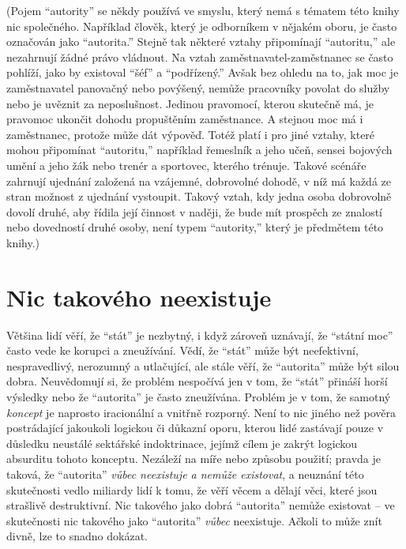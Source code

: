 \documentclass{book}
\begin{document}
(Pojem \enquote{autority} se někdy používá ve smyslu, který nemá s tématem této knihy nic společného. Například člověk, který je odborníkem v nějakém oboru, je často označován jako \enquote{autorita.} Stejně tak některé vztahy připomínají \enquote{autoritu,} ale nezahrnují žádné právo vládnout. Na vztah zaměstnavatel-zaměstnanec se často pohlíží, jako by existoval \enquote{šéf} a \enquote{podřízený.} Avšak bez ohledu na to, jak moc je zaměstnavatel panovačný nebo povýšený, nemůže pracovníky povolat do služby nebo je uvěznit za neposlušnost. Jedinou pravomocí, kterou skutečně má, je pravomoc ukončit dohodu propuštěním zaměstnance. A stejnou moc má i zaměstnanec, protože může dát výpověď. Totéž platí i pro jiné vztahy, které mohou připomínat \enquote{autoritu,} například řemeslník a jeho učeň, sensei bojových umění a jeho žák nebo trenér a sportovec, kterého trénuje. Takové scénáře zahrnují ujednání založená na vzájemné, dobrovolné dohodě, v níž má každá ze stran možnost z ujednání vystoupit. Takový vztah, kdy jedna osoba dobrovolně dovolí druhé, aby řídila její činnost v naději, že bude mít prospěch ze znalostí nebo dovedností druhé osoby, není typem \enquote{autority,} který je předmětem této knihy.)

\section{Nic takového neexistuje}

Většina lidí věří, že \enquote{stát} je nezbytný, i když zároveň uznávají, že \enquote{státní moc} často vede ke korupci a zneužívání. Vědí, že \enquote{stát} může být neefektivní, nespravedlivý, nerozumný a utlačující, ale stále věří, že \enquote{autorita} může být silou dobra. Neuvědomují si, že problém nespočívá jen v tom, že \enquote{stát} přináší horší výsledky nebo že \enquote{autorita} je často zneužívána. Problém je v tom, že samotný \emph{koncept} je naprosto iracionální a vnitřně rozporný. Není to nic jiného než pověra postrádající jakoukoli logickou či důkazní oporu, kterou lidé zastávají pouze v důsledku neustálé sektářské indoktrinace, jejímž cílem je zakrýt logickou absurditu tohoto konceptu. Nezáleží na míře nebo způsobu použití; pravda je taková, že \enquote{autorita} \emph{vůbec neexistuje a nemůže existovat}, a neuznání této skutečnosti vedlo miliardy lidí k tomu, že věří věcem a dělají věci, které jsou strašlivě destruktivní. Nic takového jako dobrá \enquote{autorita} nemůže existovat -- ve skutečnosti nic takového jako \enquote{autorita} \emph{vůbec} neexistuje. Ačkoli to může znít divně, lze to snadno dokázat.
\end{document}
